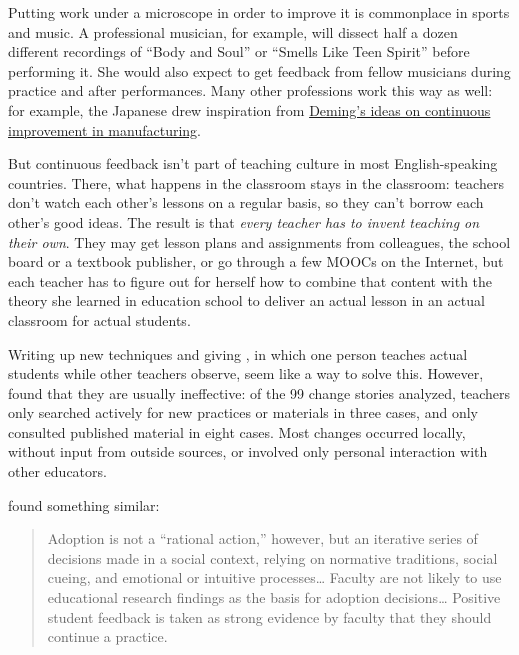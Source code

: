 Putting work under a microscope in order to improve it is commonplace
in sports and music. A professional musician, for example, will
dissect half a dozen different recordings of ``Body and Soul'' or
``Smells Like Teen Spirit'' before performing it.  She would also
expect to get feedback from fellow musicians during practice and after
performances.  Many other professions work this way as well: for
example, the Japanese drew inspiration from
\href{https://en.wikipedia.org/wiki/W.\_Edwards\_Deming}{Deming's
  ideas on continuous improvement in manufacturing}.

But continuous feedback isn't part of teaching culture in most
English-speaking countries. There, what happens in the classroom stays
in the classroom: teachers don't watch each other's lessons on a
regular basis, so they can't borrow each other's good ideas. The
result is that \emph{every teacher has to invent teaching on their
  own}. They may get lesson plans and assignments from colleagues, the
school board or a textbook publisher, or go through a few MOOCs on the
Internet, but each teacher has to figure out for herself how to
combine that content with the theory she learned in education school
to deliver an actual lesson in an actual classroom for actual
students.

Writing up new techniques and giving
, in which one
person teaches actual students while other teachers observe, seem like
a way to solve this.  However, \cite{Finc2007,Finc2012} found that
they are usually ineffective: of the 99 change stories analyzed,
teachers only searched actively for new practices or materials in
three cases, and only consulted published material in eight cases.
Most changes occurred locally, without input from outside sources, or
involved only personal interaction with other educators.

\noindent
\cite{Bark2015} found something similar:

\begin{quote}

  Adoption is not a ``rational action,'' however, but an iterative
  series of decisions made in a social context, relying on normative
  traditions, social cueing, and emotional or intuitive
  processes{\ldots} Faculty are not likely to use educational research
  findings as the basis for adoption decisions{\ldots} Positive
  student feedback is taken as strong evidence by faculty that they
  should continue a practice.

\end{quote}

